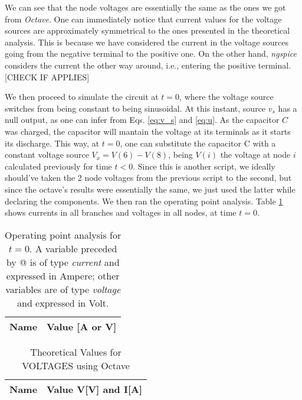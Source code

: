 \par We can see that the node voltages are essentially the same as the ones we got from \textit{Octave}. One can immediately notice that current values for the voltage sources are approximately symmetrical to the ones presented in the theoretical analysis. This is because we have considered the current in the voltage sources going from the negative terminal to the positive one. On the other hand, \emph{ngspice} considers the current the other way around, i.e., entering the positive terminal. [CHECK IF APPLIES]

\par We then proceed to simulate the circuit at $t=0$, where the voltage source switches from being constant to being sinusoidal. At this instant, source $v_s$ has a null output, as one can infer from Eqs. \ref{eq:v_s} and \ref{eq:u}. As the capacitor $C$ was charged, the capacitor will mantain the voltage at its terminals as it starts its discharge. This way, at $t=0$, one can substitute the capacitor C with a constant voltage source $V_x = V(6)-V(8)$, being $V(i)$ the voltage at node $i$ calculated previously for time $t<0$. Since this is another script, we ideally should've taken the 2 node voltages from the previous script to the second, but since the octave's results were essentially the same, we just used the latter while declaring the components. We then ran the operating point analysis. Table \ref{tab:ngspice_2} shows currents in all branches and voltages in all nodes, at time $t=0$.
\pagebreak
\begin{multicols}{2}
\begin{table}[H]
  \centering
  \begin{tabular}{|l|r|}
    \hline
    {\bf Name} & {\bf Value [A or V]} \\ \hline
    
  \end{tabular}
  \caption{Operating point analysis for $t=0$. A variable preceded by @ is of type {\em current}
    and expressed in Ampere; other variables are of type {\it voltage} and expressed in
    Volt.}
  \label{tab:ngspice_2}
\end{table}

\begin{table}[H]
  \centering
  \begin{tabular}{|l|r|}
    \hline
    {\bf Name} & {\bf Value V[V] and I[A]} \\ \hline
    
  \end{tabular}
  \caption{Theoretical Values for VOLTAGES using Octave}
  \label{tab:alinea2_voltagens_tab_2}
\end{table}
\end{multicols}

